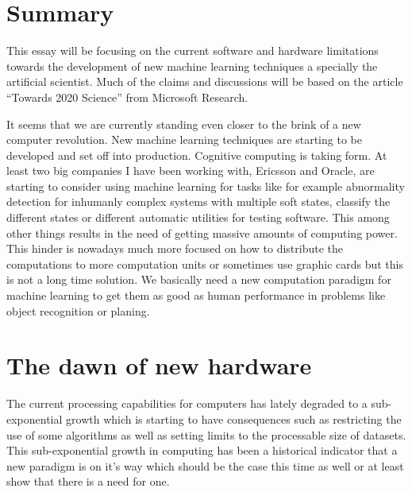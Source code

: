 \documentclass{article}
\begin{document}

\section{Summary}
    This essay will be focusing on the current software and hardware limitations
    towards the development of new machine learning techniques a specially the
    artificial scientist. Much of the claims and discussions will be based on
    the article ``Towards 2020 Science'' from Microsoft Research.\cite{ms2020}

    It seems that we are currently standing even closer to the brink of a new 
    computer revolution. New machine learning techniques are starting to be 
    developed and set off into production. Cognitive computing is taking form.
    At least two big companies I have 
    been working with, Ericsson and Oracle, are starting to consider using 
    machine learning for tasks like for example abnormality detection for 
    inhumanly complex systems with multiple soft
    states, classify the different states or different automatic utilities for
    testing software. This among other things results in
    the need of getting massive amounts of computing power.
    This hinder is nowadays much more focused on how to 
    distribute the computations to more computation units or sometimes use
    graphic cards but this is not a long time solution. We basically need a new
    computation paradigm for machine learning to get them as good as human
    performance in problems like object recognition or planing.



\section{The dawn of new hardware}
    The current processing capabilities for computers has lately degraded to a
    sub-exponential growth which is starting to have consequences such as 
    restricting the use of some algorithms as well as setting limits 
    to the processable size of datasets.
    This sub-exponential growth in computing has been a historical indicator
    that a new paradigm is on it's way which should be the case this time as
    well or at least show that there is a need for one.%
    
\end{document}

